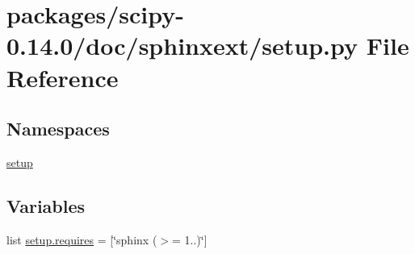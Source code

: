\hypertarget{packages_2scipy-0_814_80_2doc_2sphinxext_2setup_8py}{}\section{packages/scipy-\/0.14.0/doc/sphinxext/setup.py File Reference}
\label{packages_2scipy-0_814_80_2doc_2sphinxext_2setup_8py}
\subsection*{Namespaces}
\begin{DoxyCompactItemize}
\item 
 \hyperlink{namespacesetup}{setup}
\end{DoxyCompactItemize}
\subsection*{Variables}
\begin{DoxyCompactItemize}
\item 
list \hyperlink{namespacesetup_a8491c6c6f1a6520e3c1e7b345214ab86}{setup.\+requires} = \mbox{[}\char`\"{}sphinx ($>$= 1..)\char`\"{}\mbox{]}
\end{DoxyCompactItemize}
